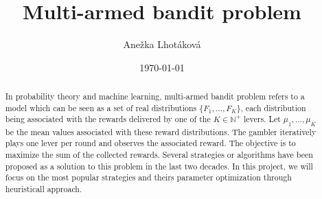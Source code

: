 \documentclass[11pt,american,czech]{article}
\newcommand{\N}{\mathbb{N}} %
\begin{document}
	\title{Multi-armed bandit problem}
	\author{Anežka Lhotáková}
	\date{\today}
	\maketitle
	\begin{abstract}
		In probability theory and machine learning, multi-armed bandit problem refers to a model which can be seen as a set of real distributions $\{F_1,\dots,F_K\}$, each distribution being associated with the rewards delivered by one of the $K\in\N^+$ levers. Let $\mu_1,\dots,\mu_K$ be the mean values associated with these reward distributions. The gambler iteratively plays one lever per round and observes the associated reward. The objective is to maximize the sum of the collected rewards. Several strategies or algorithms have been proposed as a solution to this problem in the last two decades. In this project, we will focus on the most popular strategies and theirs parameter optimization through heuristicall approach.
	\end{abstract}
\end{document}
